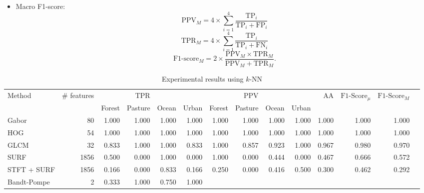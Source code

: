 \documentclass[journal]{IEEEtran}
\begin{document}
\begin{itemize}
		\item Macro F1-score: 
		\begin{equation*}
		\text{PPV}_M = 4 \times \sum^{\text{4}}_{i = 1}\frac{\text{TP}_i}{\text{TP}_i + \text{FP}_i}
		\end{equation*}
		\begin{equation*}
		\text{TPR}_M = 4 \times \sum^{\text{4}}_{i = 1}\frac{\text{TP}_i}{\text{TP}_i + \text{FN}_i}
		\end{equation*}
		\begin{equation*}
		\text{F1-score}_M = 2 \times \frac{\text{PPV}_M \times \text{TPR}_M}{\text{PPV}_M + \text{TPR}_M}.
		\end{equation*}
	\end{itemize}
	
	\begin{table}%
		\centering
		\caption{Experimental results using $k$-NN}
		\label{tab:result1}
		\begin{tabular}{lrrrr*9{r}}
			\toprule
			\multirow{2}{*}{Method} & \multirow{2}{*}{\# features} & & TPR & & & & PPV & & & \multirow{2}{*}{AA} & \multirow{2}{*}{$\text{F1-Score}_{\mu}$} & \multirow{2}{*}{$\text{F1-Score}_M$} \\ 
			\cmidrule(lr){3-6} 
			\cmidrule(lr){7-10}
			&   & Forest & Pasture & Ocean & Urban & Forest & Pasture & Ocean & Urban & &  \\ 
			\cmidrule(lr){1-1}
			\cmidrule(lr){2-2}
			\cmidrule(lr){3-6}
			\cmidrule(lr){7-10}
			\cmidrule(lr){11-11}
			\cmidrule(lr){12-12}
			\cmidrule(lr){13-13}
			Gabor & 80 & 
			1.000 & 1.000 & 1.000 & 1.000 & 
			1.000 & 1.000 & 1.000 & 1.000 & 
			1.000 & 1.000 & 1.000\\
			HOG & 54 & 
			1.000 & 1.000 & 1.000 & 1.000 & 
			1.000 & 1.000 & 1.000 & 1.000 & 
			1.000 & 1.000 & 1.000\\
			GLCM & 32 & 
			0.833 & 1.000 & 1.000 & 0.833 &
			1.000 & 0.857 & 0.923 & 1.000 &
			0.967 & 0.980 & 0.970\\
			SURF & 1856 & 
			0.500 & 0.000 & 1.000 & 0.000 & 
			1.000 & 0.000 & 0.444 & 0.000 &
			0.467 & 0.666 & 0.572\\
			STFT + SURF  & 1856 & 
			0.166 & 0.000 & 0.833 & 0.166 & 
			0.250 & 0.000 & 0.416 & 0.500 &
			0.300 & 0.462 & 0.292\\
			\cmidrule(lr){1-1}
			\cmidrule(lr){2-2}
			\cmidrule(lr){3-6}
			\cmidrule(lr){7-10}
			\cmidrule(lr){11-11}
			\cmidrule(lr){12-12}
			\cmidrule(lr){13-13}
			Bandt-Pompe & 2 & 
			0.333 & 1.000 & 0.750 & 1.000 &

\end{tabular}
\end{table}
\end{document}

